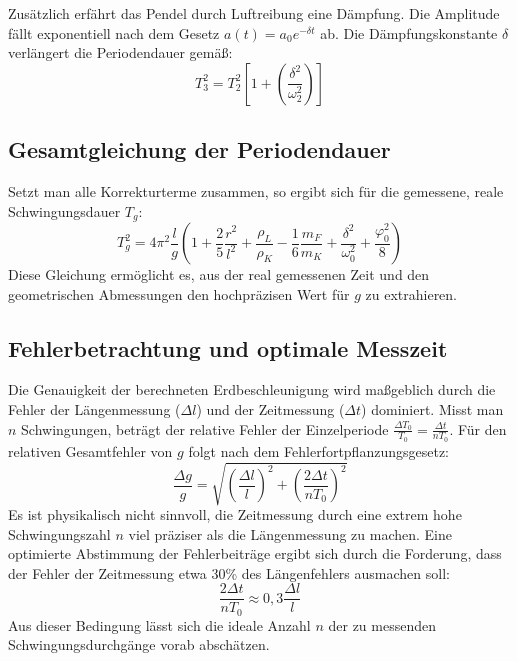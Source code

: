 \documentclass[12pt,a4paper,titlepage]{scrartcl}
\numberwithin{equation}{section}
\numberwithin{table}{section}
\numberwithin{figure}{section}
\begin{document}
Zusätzlich erfährt das Pendel durch Luftreibung eine Dämpfung. Die Amplitude fällt exponentiell nach dem Gesetz $a(t) = a_0 e^{-\delta t}$ ab. Die Dämpfungskonstante $\delta$ verlängert die Periodendauer gemäß:
\begin{equation}
    T_3^2 = T_2^2 \left[ 1 + \left(\frac{\delta^2}{\omega_2^2}\right) \right]
    \label{eq:T3}
\end{equation}

\subsection{Gesamtgleichung der Periodendauer}
Setzt man alle Korrekturterme zusammen, so ergibt sich für die gemessene, reale Schwingungsdauer $T_g$:
\begin{equation}
    T_g^2 = 4\pi^2 \frac{l}{g} \left( 1 + \frac{2}{5}\frac{r^2}{l^2} + \frac{\rho_L}{\rho_K} - \frac{1}{6}\frac{m_F}{m_K} + \frac{\delta^2}{\omega_0^2} + \frac{\varphi_0^2}{8} \right)
    \label{eq:T_gesamt}
\end{equation}
Diese Gleichung ermöglicht es, aus der real gemessenen Zeit und den geometrischen Abmessungen den hochpräzisen Wert für $g$ zu extrahieren.

\subsection{Fehlerbetrachtung und optimale Messzeit}
Die Genauigkeit der berechneten Erdbeschleunigung wird maßgeblich durch die Fehler der Längenmessung ($\Delta l$) und der Zeitmessung ($\Delta t$) dominiert. Misst man $n$ Schwingungen, beträgt der relative Fehler der Einzelperiode $\frac{\Delta T_0}{T_0} = \frac{\Delta t}{n T_0}$.
Für den relativen Gesamtfehler von $g$ folgt nach dem Fehlerfortpflanzungsgesetz:
\begin{equation}
    \frac{\Delta g}{g} = \sqrt{ \left(\frac{\Delta l}{l}\right)^2 + \left(\frac{2\Delta t}{n T_0}\right)^2 }
    \label{eq:Fehler_g}
\end{equation}
Es ist physikalisch nicht sinnvoll, die Zeitmessung durch eine extrem hohe Schwingungszahl $n$ viel präziser als die Längenmessung zu machen. Eine optimierte Abstimmung der Fehlerbeiträge ergibt sich durch die Forderung, dass der Fehler der Zeitmessung etwa 30\% des Längenfehlers ausmachen soll:
\begin{equation}
    \frac{2\Delta t}{n T_0} \approx 0,3 \frac{\Delta l}{l}
    \label{eq:n_opt}
\end{equation}
Aus dieser Bedingung lässt sich die ideale Anzahl $n$ der zu messenden Schwingungsdurchgänge vorab abschätzen.
\end{document}
